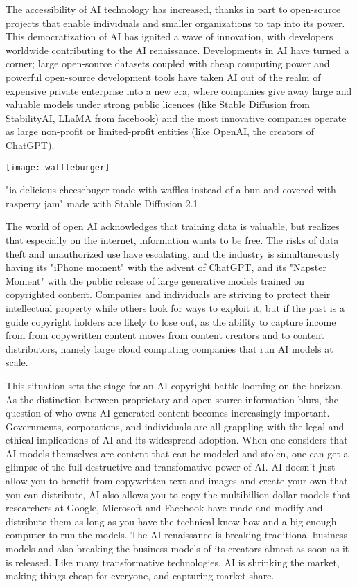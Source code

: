 The accessibility of AI technology has increased, thanks in part to open-source projects that enable individuals and smaller organizations to tap into its power. This democratization of AI has ignited a wave of innovation, with developers worldwide contributing to the AI renaissance. Developments in AI have turned a corner; large open-source datasets coupled with cheap computing power and powerful open-source development tools have taken AI out of the realm of expensive private enterprise into a new era, where companies give away large and valuable models under strong public licences (like Stable Diffusion from StabilityAI, LLaMA from facebook) and the most innovative companies operate as large non-profit or limited-profit entities (like OpenAI, the creators of ChatGPT).   

\begin{marginfigure}[-5.5cm]
    \texttt{[image: waffleburger]}
        \caption{"ia delicious cheesebuger made with waffles instead of a bun and covered with rasperry jam" made with Stable Diffusion 2.1}
\end{marginfigure}

The world of open AI acknowledges that training data is valuable, but realizes that especially on the internet, information wants to be free.  The risks of data theft and unauthorized use have escalating, and the industry is simultaneously having its "iPhone moment" with the advent of ChatGPT, and its "Napster Moment" with the public release of large generative models trained on copyrighted content. Companies and individuals are striving to protect their intellectual property while others look for ways to exploit it, but if the past is a guide copyright holders are likely to lose out, as the ability to capture income from from copywritten content moves from content creators and to content distributors, namely large cloud computing companies that run AI models at scale.

This situation sets the stage for an AI copyright battle looming on the horizon. As the distinction between proprietary and open-source information blurs, the question of who owns AI-generated content becomes increasingly important. Governments, corporations, and individuals are all grappling with the legal and ethical implications of AI and its widespread adoption. When one considers that AI models themselves are content that can be modeled and stolen, one can get a glimpse of the full destructive and transfomative power of AI. AI doesn't just allow you to benefit from copywritten text and images and create your own that you can distribute, AI also allows you to copy the multibillion dollar models that researchers at Google, Microsoft and Facebook have made and modify and distribute them as long as you have the technical know-how and a big enough computer to run the models. The AI renaissance is breaking traditional business models and also breaking the business models of its creators almost as soon as it is released. Like many transformative technologies, AI is shrinking the market, making things cheap for everyone, and capturing market share.

